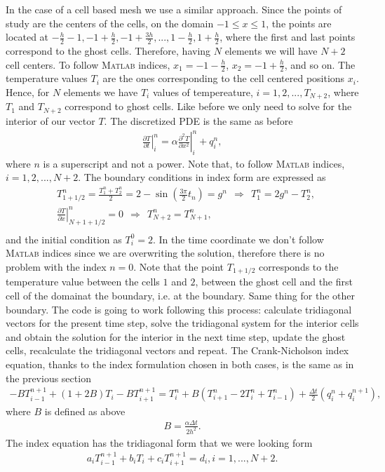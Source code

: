In the case of a cell based mesh we use a similar approach. Since the points of study are the centers of the cells, on the domain $-1\leq x\leq 1$, the points are located at $-\frac{h}{2}-1,-1+\frac{h}{2},-1+\frac{3h}{2},...,1-\frac{h}{2},1+\frac{h}{2}$, where the first and last points correspond to the ghost cells. Therefore, having $N$ elements we will have $N+2$ cell centers. To follow \textsc{Matlab} indices, $x_1=-1-\frac{h}{2}$, $x_2=-1+\frac{h}{2}$, and so on. The temperature values $T_i$ are the ones corresponding to the cell centered positions $x_i$. Hence, for $N$ elements we have $T_i$ values of tempereature, $i=1,2,...,T_{N+2}$, where $T_1$ and $T_{N+2}$ correspond to ghost cells. Like before we only need to solve for the interior of our vector $T$. The discretized PDE is the same as before
\begin{align*}
\left.\frac{\partial T}{\partial t}\right|_i^n=\alpha\left.\frac{\partial^2 T}{\partial x^2}\right|_i^n+q_i^n,
\end{align*}
where $n$ is a superscript and not a power. Note that, to follow \textsc{Matlab} indices, $i=1,2,...,N+2$. The boundary conditions in index form are expressed as
\begin{align*}
&T_{1+1/2}^n=\frac{T_1^n+T_2^n}{2}=2-\sin\left(\frac{3\pi}{2}t_n\right)=g^n~~\Rightarrow~~T_1^n=2g^n-T_2^n,\\
&\left.\frac{\partial T}{\partial x}\right|_{N+1+1/2}^n=0~~\Rightarrow~~T_{N+2}^n=T_{N+1}^n,\\
\end{align*}
and the initial condition as $T_i^0=2$. In the time coordinate we don't follow \textsc{Matlab} indices since we are overwriting the solution, therefore there is no problem with the index $n=0$. Note that the point $T_{1+1/2}$ corresponds to the temperature value between the cells $1$ and $2$, between the ghost cell and the first cell of the domainat the boundary, i.e. at the boundary. Same thing for the other boundary. The code is going to work following this process: calculate tridiagonal vectors for the present time step, solve the tridiagonal system for the interior cells and obtain the solution for the interior in the next time step, update the ghost cells, recalculate the tridiagonal vectors and repeat. The Crank-Nicholson index equation, thanks to the index formulation chosen in both cases, is the same as in the previous section
\begin{align*}
-BT_{i-1}^{n+1}+(1+2B)T_i-BT_{i+1}^{n+1}=T_i^n+B\left(T_{i+1}^n-2T_{i}^n+T_{i-1}^n\right)+\frac{\Delta t}{2}\left(q_i^n+q_i^{n+1}\right),
\end{align*}
where $B$ is defined as above
\begin{align*}
B=\frac{\alpha\Delta t}{2h^2}.
\end{align*}
The index equation has the tridiagonal form that we were looking form
\begin{align*}
a_iT_{i-1}^{n+1}+b_iT_i+c_iT_{i+1}^{n+1}=d_i, i=1,...,N+2.
\end{align*}

